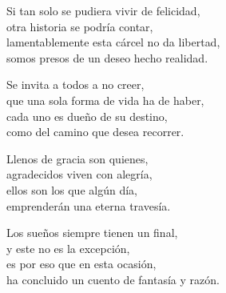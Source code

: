 \begin{center}
\vspace{4em} 
Si tan solo se pudiera vivir de felicidad,\\ 
otra historia se podría contar,\\ 
lamentablemente esta cárcel no da libertad,\\ 
somos presos de un deseo hecho realidad.

\vspace{1em} 
Se invita a todos a no creer,\\ 
que una sola forma de vida ha de haber,\\ 
cada uno es dueño de su destino,\\ 
como del camino que desea recorrer.

\vspace{1em} 
Llenos de gracia son quienes,\\ 
agradecidos viven con alegría,\\ 
ellos son los que algún día,\\ 
emprenderán una eterna travesía.

\vspace{1em} 
Los sueños siempre tienen un final,\\ 
y este no es la excepción,\\ 
es por eso que en esta ocasión,\\ 
ha concluido un cuento de fantasía y razón.

\end{center}




